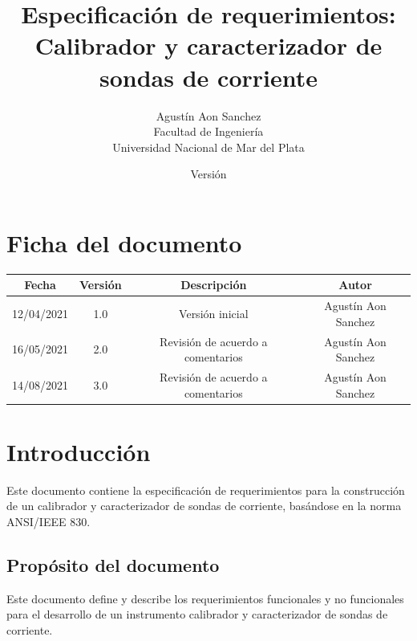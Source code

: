 \documentclass[titlepage, 12pt]{article}
\title{Especificación de requerimientos:\\Calibrador y caracterizador de sondas de corriente}
\author{Agustín Aon Sanchez\\
Facultad de Ingeniería\\
Universidad Nacional de Mar del Plata}
\date{Versión \version}
\newcommand{\fecha}{14/08/2021}
\newcommand{\version}{3.0}
\begin{document}
\maketitle



\section{Ficha del documento}
\begin{table}[!hbtp]
  \centering
  \begin{tabular}{|c|c|c|c|}
  \hline
  \rowcolor[HTML]{C0C0C0}
  Fecha      & Versión  & Descripción       & Autor               \\ \hline
  12/04/2021 & 1.0      & Versión inicial   & Agustín Aon Sanchez \\ \hline
  16/05/2021 & 2.0      & Revisión de acuerdo a comentarios & Agustín Aon Sanchez \\ \hline
  \fecha & \version & Revisión de acuerdo a comentarios & Agustín Aon Sanchez \\ \hline
  \end{tabular}
\end{table}

\newpage
\tableofcontents
\newpage
\listoffigures
\newpage

\section{Introducción}
Este documento contiene la especificación de requerimientos para la construcción de un calibrador y caracterizador de sondas de corriente, basándose en la norma ANSI/IEEE 830.

  \subsection{Propósito del documento}
  Este documento define y describe los requerimientos funcionales y no funcionales para el desarrollo de un instrumento calibrador y caracterizador de sondas de corriente.
\end{document}
